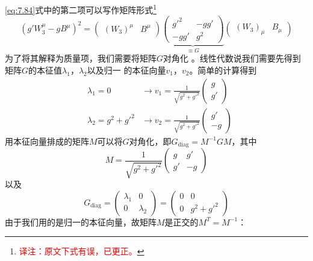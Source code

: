 \ref{eq:7.84}式中的第二项可以写作矩阵形式\footnote{\textcolor{red}{译注：原文下式有误，已更正。}}
\begin{equation}
(g'W_3^\mu-gB^\mu)^2 = \begin{pmatrix}
(W_3)^\mu & B^\mu
\end{pmatrix} \underbrace{\begin{pmatrix}
g'^2 & -gg' \\ -gg' & g^2
\end{pmatrix}}_{\equiv G} \begin{pmatrix}
(W_3)_\mu & B_\mu
\end{pmatrix}
\label{eq:7.89}
\end{equation}
为了将其解释为质量项，我们需要将矩阵$G$对角化%
%
。线性代数说我们需要先得到矩阵$G$的本征值$\lambda_1$，$\lambda_2$以及归一%
%
的本征向量$v_1$，$v_2$。简单的计算得到
\[
\begin{aligned}
&\lambda_1 = 0 &\rightarrow v_1 = \frac{1}{\sqrt{g^2+g'^2}} \begin{pmatrix}
g\\ g'
\end{pmatrix} \\
&\lambda_2 = g^2+g'^2 &\rightarrow v_2 = \frac{1}{\sqrt{g^2+g'^2}} \begin{pmatrix}
g'\\ -g
\end{pmatrix}
\end{aligned}
\]
用本征向量排成的矩阵$M$可以将$G$对角化，即$G_\text{diag}=M^{-1}GM$，其中
\begin{equation}
M = \frac{1}{\sqrt{g^2+g'^2}} \begin{pmatrix}
g & g'\\ g'&-g
\end{pmatrix}
\end{equation}
以及
\begin{equation}
G_\text{diag} = \begin{pmatrix}
\lambda_1 & 0 \\ 0 & \lambda_2
\end{pmatrix} = \begin{pmatrix}
0 & 0 \\ 0 & g^2+g'^2
\end{pmatrix}
\end{equation}
由于我们用的是归一的本征向量，故矩阵$M$是正交的$M^T = M^{-1}$：
